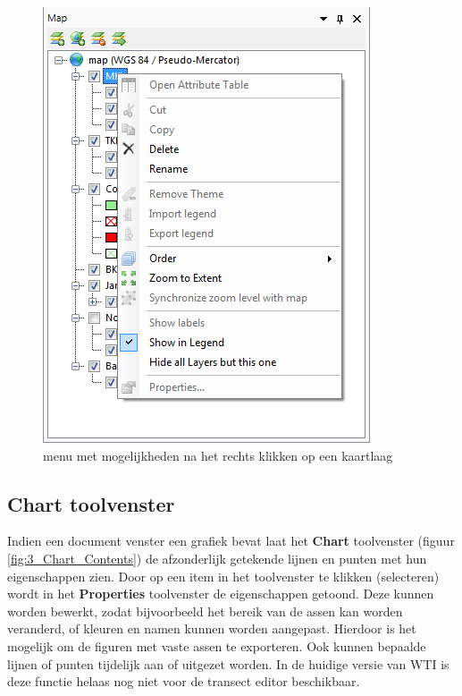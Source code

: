 \begin{figure}[h!]
	\centering
		\includegraphics{figures/chapter_general/wti_MapLayer_Context_Menu.png}
		\caption{menu met mogelijkheden na het rechts klikken op een kaartlaag}
	\label{fig:MapLayer_Context_Menu}
\end{figure}

\subsection{Chart toolvenster}
	\label{DS_Chart_Contents}
Indien een document venster een grafiek bevat laat het \textbf{Chart} toolvenster (figuur \ref{fig:3_Chart_Contents}) de afzonderlijk getekende lijnen en punten met hun eigenschappen zien. Door op een item in het toolvenster te klikken (selecteren) wordt in het \textbf{Properties} toolvenster de eigenschappen getoond. Deze kunnen worden bewerkt, zodat bijvoorbeeld het bereik van de assen kan worden veranderd, of kleuren en namen kunnen worden aangepast. Hierdoor is het mogelijk om de figuren met vaste assen te exporteren. Ook kunnen bepaalde lijnen of punten tijdelijk aan of uitgezet worden. In de huidige versie van WTI is deze functie helaas nog niet voor de transect editor beschikbaar.

